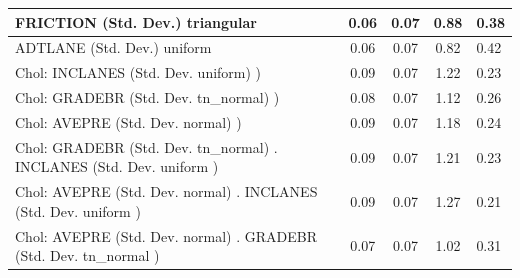 \begin{table}
\begin{center}
\begin{tabular}{|l|l|c|c|c|l|}
			\hline
			FRICTION (Std. Dev.) triangular &  & 0.06 & 0.07 & 0.88 & 0.38 \\
			\hline
			ADTLANE (Std. Dev.) uniform &  & 0.06 & 0.07 & 0.82 & 0.42 \\
			\hline
			 Chol: INCLANES (Std. Dev. uniform) ) &  & 0.09 & 0.07 & 1.22 & 0.23 \\
			\hline
			 Chol: GRADEBR (Std. Dev. tn_normal) ) &  & 0.08 & 0.07 & 1.12 & 0.26 \\
			\hline
			 Chol: AVEPRE (Std. Dev. normal) ) &  & 0.09 & 0.07 & 1.18 & 0.24 \\
			\hline
			 Chol: GRADEBR (Std. Dev. tn_normal) . INCLANES (Std. Dev.   uniform ) &  & 0.09 & 0.07 & 1.21 & 0.23 \\
			\hline
			 Chol: AVEPRE (Std. Dev. normal) . INCLANES (Std. Dev.   uniform ) &  & 0.09 & 0.07 & 1.27 & 0.21 \\
			\hline
			 Chol: AVEPRE (Std. Dev. normal) . GRADEBR (Std. Dev.   tn_normal ) &  & 0.07 & 0.07 & 1.02 & 0.31 \\
			\hline
		\end{tabular}
	\end{center}
\end{table}